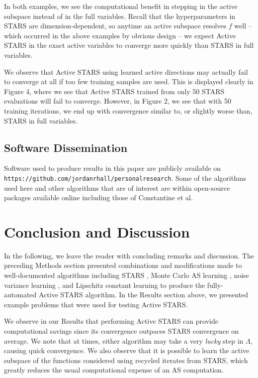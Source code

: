 \documentclass{amsart}
\begin{document}
In both examples, we see the computational benefit in stepping in the active subspace instead of in the full variables. Recall that the hyperparameters in STARS are dimension-dependent, so anytime an active subspace resolves $f$ well -- which occurred in the above examples by obvious design -- we expect Active STARS in the exact active variables to converge more quickly than STARS in full variables.  

We observe that Active STARS using learned active directions may actually fail to converge at all if too few training samples are used. This is displayed clearly in Figure 4, where we see that Active STARS trained from only 50 STARS evaluations will fail to converge. However, in Figure 2, we see that with 50 training iterations, we end up with convergence similar to, or slightly worse than, STARS in full variables.






\subsection{Software Dissemination}

Software used to produce results in this paper are publicly available on \texttt{https://github.com/jordanrhall/personalresearch}. Some of the algorithms used here and other algorithms that are of interest are within open-source packages available online including those of Constantine et al.


\section{Conclusion and Discussion}

In the following, we leave the reader with concluding remarks and discussion. The preceding Methods section presented combinations and modifications made to well-documented algorithms including STARS \cite{CW}, Monte Carlo AS learning \cite{ConstantineMC}, noise variance learning \cite{MW}, and Lipschitz constant learning \cite{Calliess} to produce the fully-automated Active STARS algorithm. In the Results section above, we presented example problems that were used for testing Active STARS.

We observe in our Results that performing Active STARS can provide computational savings since its convergence outpaces STARS convergence on average. We note that at times, either algorithm may take a very \textit{lucky} step in $\Lambda$, causing quick convergence. We also observe that it is possible to learn the active subspace of the functions considered using recycled iterates from STARS, which greatly reduces the usual computational expense of an AS computation.
\end{document}
